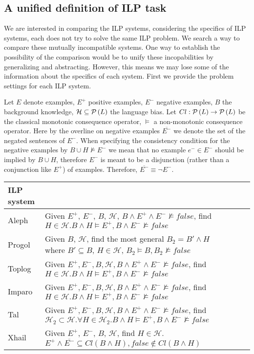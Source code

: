 \subsection{A unified definition of ILP task}
We are interested in comparing the ILP systems, considering the specifics of ILP systems, each does not try to solve the same ILP problem. We search a way to compare these mutually incompatible systems. One way to establish the possibility of the comparison would be to unify these incopabilities by generalizing and abstracting. However, this means we may lose some of the information about the specifics of each system. First we provide the problem settings for each ILP system.

Let $E$ denote examples, $E^{+}$ positive examples, $E^{-}$ negative examples, $B$ the background knowledge, $\mathcal{H} \subseteq \mathcal{P} \left({ L }\right)$ the language bias. Let $Cl:\mathcal{P} \left({ L }\right) \to \mathcal{P} \left({ L }\right)$ be the classical monotonic consequence operator, $\models$ a non-monotonic consequence operator. Here by the overline on negative examples $\overline{E^{-}}$ we denote the set of the negated sentences of $E^{-}$. When specifying the consistency condition for the negative examples by $B \cup H \not\models E^{-}$ we mean that no example $e^{-} \in E^{-}$ should be implied by $B \cup H$, therefore $E^{-}$ is meant to be a disjunction (rather than a conjunction like $E^{+}$) of examples. Therefore, $\overline{E^{-}} \equiv \neg E^{-}$.

\begin{center}
    \begin{tabular}{ | l | p{15cm} | l | p{5cm} |}
    \hline
    ILP system & \\ \hline
    Aleph & Given $E^{+}$, $E^{-}$, $B$, $\mathcal{H}$, $B \land E^{+} \land E^{-} \not\models false$, find $H \in \mathcal{H}. B \land H \models E^{+}, B \land E^{-} \not\models false$\\ \hline
    Progol & Given $B$, $\mathcal{H}$, find the most general $B_2 = B' \land H$ where $B' \subseteq B$, $H \in \mathcal{H}$, $B_2 \models B, B_2 \not\models false$\\ \hline
    Toplog & Given $E^{+}, E^{-}, B, \mathcal{H}, B \land E^{+} \land E^{-} \not\models false$, find $H \in \mathcal{H}. B \land H \models E^{+}, B \land E^{-} \not\models false$ \\ \hline
    Imparo & Given $E^{+}, E^{-}, B, \mathcal{H}, B \land E^{+} \land E^{-} \not\models false$, find $H \in \mathcal{H}. B \land H \models E^{+}, B \land E^{-} \not\models false$ \\ \hline
    Tal & Given $E^{+}, E^{-}, B, \mathcal{H}, B \land E^{+} \land E^{-} \not\models false$, find $\mathcal{H}_2 \subset \mathcal{H}. \forall H \in \mathcal{H}_2. B \land H \models E^{+}, B \land E^{-} \not\models false$ \\ \hline
    Xhail & Given $E^{+}$, $E^{-}$, $B$, $\mathcal{H}$, find $H \in \mathcal{H}$. $E^{+} \land \overline{E^{-}} \subseteq Cl(B \land H), false \not\in Cl(B \land H)$\\ \hline
    \hline
    \end{tabular}
\end{center}

